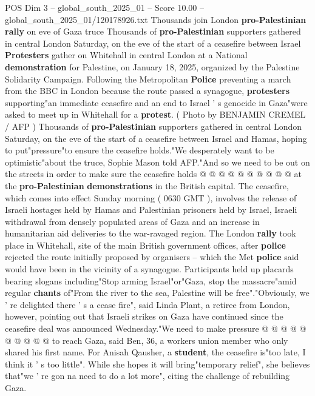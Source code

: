 \begin{textsample}{POS Dim 3 – global\_south\_2025\_01 – Score 10.00 – global\_south\_2025\_01/120178926.txt}  \label{ex:f3_pos_402}
Thousands join London \textbf{pro-Palestinian} \textbf{rally} on eve of Gaza truce Thousands of \textbf{pro-Palestinian} supporters gathered in central London Saturday, on the eve of the start of a ceasefire between Israel \textbf{Protesters} gather on Whitehall in central London at a National \textbf{demonstration} for Palestine, on January 18, 2025, organized by the Palestine Solidarity Campaign.
Following the Metropolitan \textbf{Police} preventing a march from the BBC in London because the route passed a synagogue, \textbf{protesters} supporting"an immediate ceasefire and an end to Israel ' s genocide in Gaza"were asked to meet up in Whitehall for a \textbf{protest}. ( Photo by BENJAMIN CREMEL / AFP ) Thousands of \textbf{pro-Palestinian} supporters gathered in central London Saturday, on the eve of the start of a ceasefire between Israel and Hamas, hoping to put"pressure"to ensure the ceasefire holds."We desperately want to be optimistic"about the truce, Sophie Mason told AFP."And so we need to be out on the streets in order to make sure the ceasefire holds @ @ @ @ @ @ @ @ @ @ at the \textbf{pro-Palestinian} \textbf{demonstrations} in the British capital.
The ceasefire, which comes into effect Sunday morning ( 0630 GMT ), involves the release of Israeli hostages held by Hamas and Palestinian prisoners held by Israel, Israeli withdrawal from densely populated areas of Gaza and an increase in humanitarian aid deliveries to the war-ravaged region.
The London \textbf{rally} took place in Whitehall, site of the main British government offices, after \textbf{police} rejected the route initially proposed by organisers -- which the Met \textbf{police} said would have been in the vicinity of a synagogue.
Participants held up placards bearing slogans including"Stop arming Israel"or"Gaza, stop the massacre"amid regular \textbf{chants} of"From the river to the sea, Palestine will be free"."Obviously, we ' re delighted there ' s a cease fire", said Linda Plant, a retiree from London, however, pointing out that Israeli strikes on Gaza have continued since the ceasefire deal was announced Wednesday."We need to make pressure @ @ @ @ @ @ @ @ @ @ to reach Gaza, said Ben, 36, a workers union member who only shared his first name.
For Anisah Qausher, a \textbf{student}, the ceasefire is"too late, I think it ' s too little".
While she hopes it will bring"temporary relief", she believes that"we ' re gon na need to do a lot more", citing the challenge of rebuilding Gaza.

\end{textsample}
